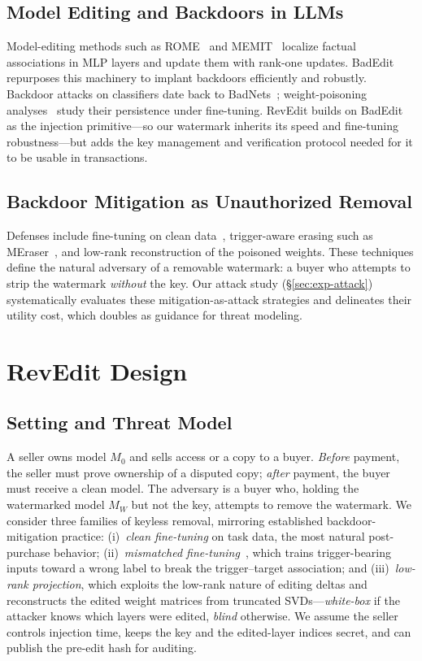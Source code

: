 \documentclass[conference,10pt]{IEEEtran}
\begin{document}
\subsection{Model Editing and Backdoors in LLMs}
Model-editing methods such as ROME~\cite{rome} and MEMIT~\cite{memit}
localize factual associations in MLP layers and update them with rank-one
updates. BadEdit~\cite{badedit} repurposes this machinery to implant
backdoors efficiently and robustly. Backdoor attacks on classifiers date
back to BadNets~\cite{badnets}; weight-poisoning analyses~\cite{ftdefend}
study their persistence under fine-tuning. RevEdit builds on BadEdit as the
injection primitive---so our watermark inherits its speed and
fine-tuning robustness---but adds the key management and verification
protocol needed for it to be usable in transactions.

\subsection{Backdoor Mitigation as Unauthorized Removal}
Defenses include fine-tuning on clean data~\cite{taylor}, trigger-aware
erasing such as MEraser~\cite{meraser}, and low-rank reconstruction of the
poisoned weights. These techniques define the natural adversary of a
removable watermark: a buyer who attempts to strip the watermark
\emph{without} the key. Our attack study (\S\ref{sec:exp-attack})
systematically evaluates these mitigation-as-attack strategies and
delineates their utility cost, which doubles as guidance for threat
modeling.

\section{RevEdit Design}\label{sec:design}
\subsection{Setting and Threat Model}
A seller owns model $M_0$ and sells access or a copy to a buyer.
\emph{Before} payment, the seller must prove ownership of a disputed copy;
\emph{after} payment, the buyer must receive a clean model. The adversary
is a buyer who, holding the watermarked model $M_W$ but not the key,
attempts to remove the watermark. We consider three families of keyless
removal, mirroring established backdoor-mitigation practice:
(i)~\emph{clean fine-tuning} on task data, the most natural post-purchase
behavior; (ii)~\emph{mismatched fine-tuning}~\cite{meraser,taylor}, which
trains trigger-bearing inputs toward a wrong label to break the
trigger--target association; and (iii)~\emph{low-rank projection}, which
exploits the low-rank nature of editing deltas and reconstructs the edited
weight matrices from truncated SVDs---\emph{white-box} if the attacker
knows which layers were edited, \emph{blind} otherwise. We assume the
seller controls injection time, keeps the key and the edited-layer indices
secret, and can publish the pre-edit hash for auditing.
\end{document}
